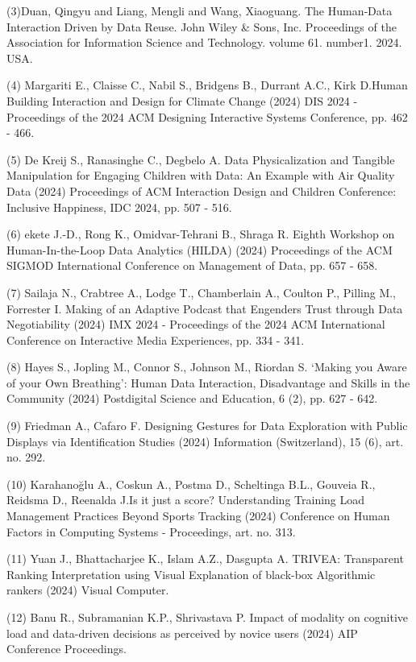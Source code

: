 \documentclass[
	12pt,				%
	oneside,			%
	a4paper,			%
	english,			%
	brazil				%
	]{abntex2ppgsi}
\begin{document}
\begin{apendicesenv}
(3)Duan, Qingyu and Liang, Mengli and Wang, Xiaoguang. The Human‐Data Interaction Driven by Data Reuse. John Wiley \& Sons, Inc. Proceedings of the Association for Information Science and Technology. volume 61. number1. 2024. USA.

(4) Margariti E., Claisse C., Nabil S., Bridgens B., Durrant A.C., Kirk D.Human Building Interaction and Design for Climate Change (2024) DIS 2024 - Proceedings of the 2024 ACM Designing Interactive Systems Conference, pp. 462 - 466. 

(5) De Kreij S., Ranasinghe C., Degbelo A. Data Physicalization and Tangible Manipulation for Engaging Children with Data: An Example with Air Quality Data (2024) Proceedings of ACM Interaction Design and Children Conference: Inclusive Happiness, IDC 2024, pp. 507 - 516.

(6) ekete J.-D., Rong K., Omidvar-Tehrani B., Shraga R.
Eighth Workshop on Human-In-the-Loop Data Analytics (HILDA)
(2024) Proceedings of the ACM SIGMOD International Conference on Management of Data, pp. 657 - 658.

(7) Sailaja N., Crabtree A., Lodge T., Chamberlain A., Coulton P., Pilling M., Forrester I. Making of an Adaptive Podcast that Engenders Trust through Data Negotiability
(2024) IMX 2024 - Proceedings of the 2024 ACM International Conference on Interactive Media Experiences, pp. 334 - 341.

(8) Hayes S., Jopling M., Connor S., Johnson M., Riordan S.
‘Making you Aware of your Own Breathing’: Human Data Interaction, Disadvantage and Skills in the Community (2024) Postdigital Science and Education, 6 (2), pp. 627 - 642.


(9) Friedman A., Cafaro F. Designing Gestures for Data Exploration with Public Displays via Identification Studies
(2024) Information (Switzerland), 15 (6), art. no. 292.

(10) Karahanoğlu A., Coskun A., Postma D., Scheltinga B.L., Gouveia R., Reidsma D., Reenalda J.Is it just a score? Understanding Training Load Management Practices Beyond Sports Tracking (2024) Conference on Human Factors in Computing Systems - Proceedings, art. no. 313.

(11) Yuan J., Bhattacharjee K., Islam A.Z., Dasgupta A. TRIVEA: Transparent Ranking Interpretation using Visual Explanation of black-box Algorithmic rankers (2024) Visual Computer.

(12) Banu R., Subramanian K.P., Shrivastava P. Impact of modality on cognitive load and data-driven decisions as perceived by novice users (2024) AIP Conference Proceedings.


\end{apendicesenv}
\end{document}
